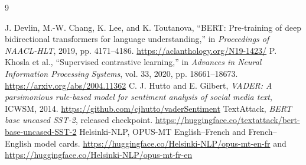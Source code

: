 \begin{thebibliography}{9}\raggedright
{} J. Devlin, M.-W. Chang, K. Lee, and K. Toutanova, ``BERT: Pre-training of deep bidirectional transformers for language understanding,'' in \emph{Proceedings of NAACL-HLT}, 2019, pp. 4171--4186. \url{https://aclanthology.org/N19-1423/}
 P. Khosla et al., ``Supervised contrastive learning,'' in \emph{Advances in Neural Information Processing Systems}, vol. 33, 2020, pp. 18661--18673. \url{https://arxiv.org/abs/2004.11362}
 C. J. Hutto and E. Gilbert, \emph{VADER: A parsimonious rule-based model for sentiment analysis of social media text}, ICWSM, 2014. \url{https://github.com/cjhutto/vaderSentiment}
 TextAttack, \emph{BERT base uncased SST-2}, released checkpoint. \url{https://huggingface.co/textattack/bert-base-uncased-SST-2}
 Helsinki-NLP, OPUS-MT English--French and French--English model cards. \url{https://huggingface.co/Helsinki-NLP/opus-mt-en-fr} and \url{https://huggingface.co/Helsinki-NLP/opus-mt-fr-en}
\end{thebibliography}
